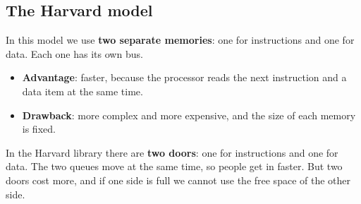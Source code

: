 \subsection{The Harvard model}
In this model we use \textbf{two separate memories}: one for instructions and one for data. Each one has its own bus.

\begin{center}
\end{center}

\begin{itemize}
    \item \textbf{Advantage}: faster, because the processor reads the next instruction and a data item at the same time.
    \item \textbf{Drawback}: more complex and more expensive, and the size of each memory is fixed.
\end{itemize}

\begin{tashbih}
    In the Harvard library there are \textbf{two doors}: one for instructions and one for data. The two
    queues move at the same time, so people get in faster. But two doors cost more, and if one side is full
    we cannot use the free space of the other side.
\end{tashbih}

